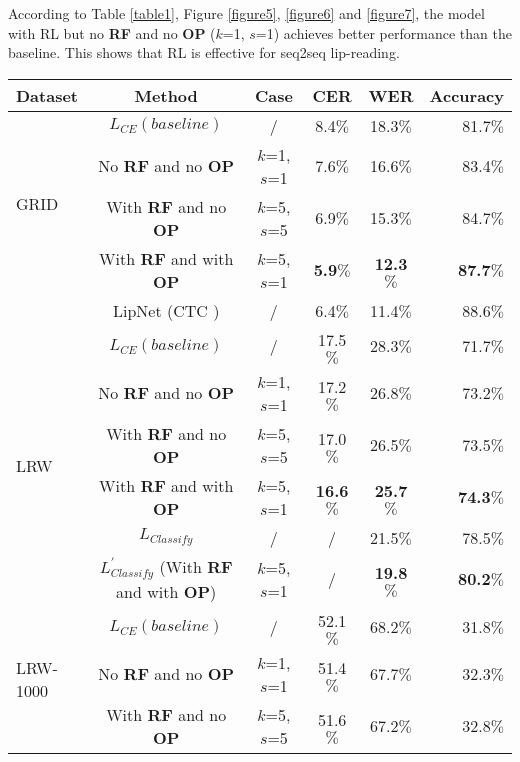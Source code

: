 \documentclass{bmvc2k}
\begin{document}
	According to Table \ref{table1}, Figure \ref{figure5}, \ref{figure6} and \ref{figure7}, the model with RL but no \textbf{RF} and no \textbf{OP} ($k$=1, $s$=1) achieves better performance than the baseline. This shows that RL is effective for seq2seq lip-reading.
	\begin{table}[H]
		\vspace{-0.3cm}  %
		\setlength{\abovecaptionskip}{0.1cm}   %
		\setlength{\belowcaptionskip}{0cm} 
		\centering
		\begin{tabular}{p{1.39cm}|c|c|ccr}    
			\hline
			\hline
			Dataset & Method& Case& CER &  WER  & Accuracy\\
			\hline
			\multirow{4}{0.5cm}{GRID}&    $L_{CE} (baseline)$ & / &8.4$\%$ & 18.3$\%$ & 81.7$\%$ \\
			~&    No \textbf{RF} and no \textbf{OP}&$k$=1, $s$=1& 7.6$\%$ & 16.6$\%$ & 83.4$\%$ \\
			~&    With \textbf{RF} and no \textbf{OP}&$k$=5, $s$=5& 6.9$\%$ & 15.3$\%$ & 84.7$\%$ \\
			~    &With \textbf{RF} and with \textbf{OP} &$k$=5, $s$=1& \textbf{5.9}$\%$ & \textbf{12.3}$\%$ & \textbf{87.7}$\%$ \\
			~ & LipNet (CTC  )\cite{Assael2016}&/&6.4$\%$&11.4$\%$&88.6$\%$\\
			\hline
			\multirow{6}{0.5cm}{LRW}&$L_{CE} (baseline)$ & /&17.5$\%$ & 28.3$\%$ & 71.7$\%$ \\
			~&No \textbf{RF} and no \textbf{OP}&$k$=1, $s$=1& 17.2$\%$ & 26.8$\%$ & 73.2$\%$\\
			~&With \textbf{RF} and no \textbf{OP}&$k$=5, $s$=5& 17.0$\%$ & 26.5$\%$ & 73.5$\%$ \\
			~&With \textbf{RF} and with \textbf{OP} &$k$=5, $s$=1& \textbf{16.6}$\%$ & \textbf{25.7}$\%$ & \textbf{74.3}$\%$\\
			~&$L_{Classify}$&  / & /&21.5$\%$ & 78.5$\%$ \\
			~&$L_{Classify}^{'}$ (With \textbf{RF} and with \textbf{OP})&  $k$=5, $s$=1 &/& \textbf{19.8}$\%$ & \textbf{80.2}$\%$ \\
			\hline
			\multirow{6}{2cm}{LRW-1000}&$L_{CE} (baseline)$             &/  & 52.1$\%$ & 68.2$\%$ &    31.8$\%$  \\
			~&No \textbf{RF} and no \textbf{OP} &$k$=1, $s$=1& 51.4$\%$ & 67.7$\%$ &    32.3$\%$ \\
			~&With \textbf{RF} and no \textbf{OP} & $k$=5, $s$=5& 51.6$\%$   &   67.2$\%$   &  32.8$\%$       \\

\end{tabular}
\end{table}
\end{document}
